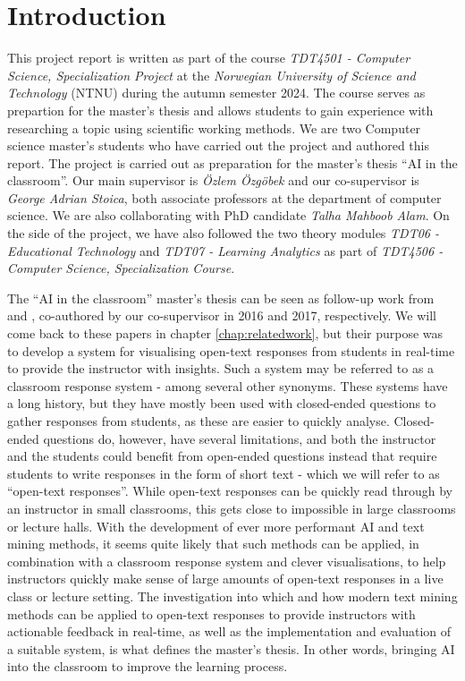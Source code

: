 \chapter{Introduction}\label{sec:introduction}

This project report is written as part of the course \textit{TDT4501 - Computer Science, Specialization Project} at the \textit{Norwegian University of Science and Technology} (NTNU) during the autumn semester 2024. The course serves as prepartion for the master's thesis and allows students to gain experience with researching a topic using scientific working methods. We are two Computer science master's students who have carried out the project and authored this report. The project is carried out as preparation for the master's thesis ``AI in the classroom''. Our main supervisor is \textit{Özlem Özgöbek} and our co-supervisor is \textit{George Adrian Stoica}, both associate professors at the department of computer science. We are also collaborating with PhD candidate \textit{Talha Mahboob Alam}. On the side of the project, we have also followed the two theory modules \textit{TDT06 - Educational Technology} and \textit{TDT07 - Learning Analytics} as part of \textit{TDT4506 - Computer Science, Specialization Course}.

The ``AI in the classroom'' master's thesis can be seen as follow-up work from \cite{stoica2016} and \cite{stoica2017}, co-authored by our co-supervisor in 2016 and 2017, respectively. We will come back to these papers in chapter \ref{chap:relatedwork}, but their purpose was to develop a system for visualising open-text responses from students in real-time to provide the instructor with insights. Such a system may be referred to as a classroom response system - among several other synonyms. These systems have a long history, but they have mostly been used with closed-ended questions to gather responses from students, as these are easier to quickly analyse. Closed-ended questions do, however, have several limitations, and both the instructor and the students could benefit from open-ended questions instead that require students to write responses in the form of short text - which we will refer to as ``open-text responses''. While open-text responses can be quickly read through by an instructor in small classrooms, this gets close to impossible in large classrooms or lecture halls. With the development of ever more performant AI and text mining methods, it seems quite likely that such methods can be applied, in combination with a classroom response system and clever visualisations, to help instructors quickly make sense of large amounts of open-text responses in a live class or lecture setting. The investigation into which and how modern text mining methods can be applied to open-text responses to provide instructors with actionable feedback in real-time, as well as the implementation and evaluation of a suitable system, is what defines the master's thesis. In other words, bringing AI into the classroom to improve the learning process.

